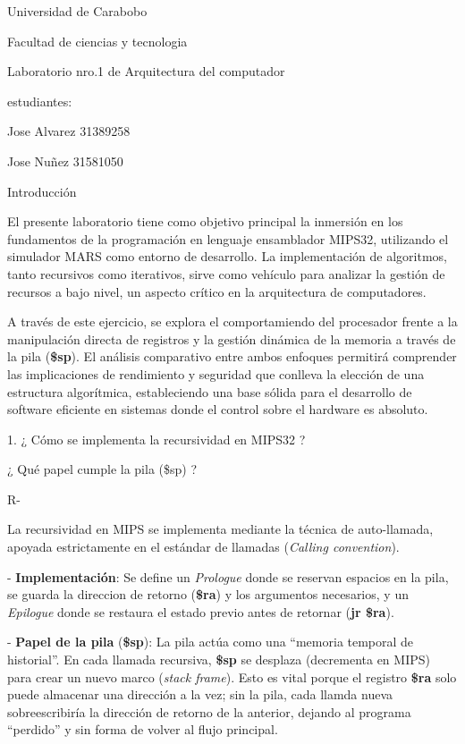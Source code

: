 \documentclass[
]{article}
\author{}
\date{}
\begin{document}
\begin{center}
    Universidad de Carabobo

Facultad de ciencias y tecnologia

Laboratorio nro.1 de Arquitectura del computador
\end{center}


estudiantes:

Jose Alvarez 31389258

Jose Nuñez 31581050

\begin{center}
Introducción
\end{center}


El presente laboratorio tiene como objetivo principal la inmersión en
los fundamentos de la programación en lenguaje ensamblador MIPS32,
utilizando el simulador MARS como entorno de desarrollo. La
implementación de algoritmos, tanto recursivos como iterativos, sirve
como vehículo para analizar la gestión de recursos a bajo nivel, un
aspecto crítico en la arquitectura de computadores.

A través de este ejercicio, se explora el comportamiendo del procesador
frente a la manipulación directa de registros y la gestión dinámica de
la memoria a través de la pila (\textbf{\$sp}). El análisis comparativo
entre ambos enfoques permitirá comprender las implicaciones de
rendimiento y seguridad que conlleva la elección de una estructura
algorítmica, estableciendo una base sólida para el desarrollo de
software eficiente en sistemas donde el control sobre el hardware es
absoluto.

1. ¿ Cómo se implementa la recursividad en MIPS32 ?

¿ Qué papel cumple la pila (\$sp) ?

R-

La recursividad en MIPS se implementa mediante la técnica de
auto-llamada, apoyada estrictamente en el estándar de llamadas
(\emph{Calling convention}).

- \textbf{Implementación}: Se define un \emph{Prologue} donde se
reservan espacios en la pila, se guarda la direccion de retorno
(\textbf{\$ra}) y los argumentos necesarios, y un \emph{Epilogue} donde
se restaura el estado previo antes de retornar (\textbf{jr \$ra}).

- \textbf{Papel de la pila} (\textbf{\$sp}): La pila actúa como una
``memoria temporal de historial''. En cada llamada recursiva,
\textbf{\$sp} se desplaza (decrementa en MIPS) para crear un nuevo marco
(\emph{stack frame}). Esto es vital porque el registro \textbf{\$ra}
solo puede almacenar una dirección a la vez; sin la pila, cada llamda
nueva sobreescribiría la dirección de retorno de la anterior, dejando al
programa ``perdido'' y sin forma de volver al flujo principal.
\end{document}
